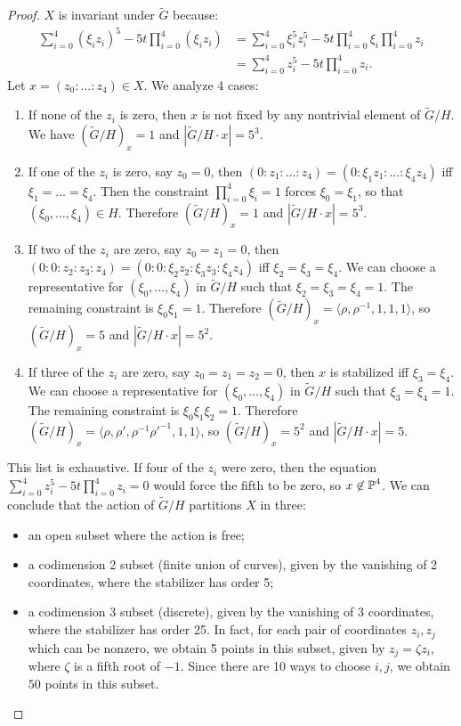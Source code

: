 \documentclass{article}
\begin{document}
\begin{proof}
$X$ is invariant under $\tilde G$ because:
\begin{align*}
\sum_{i=0}^4 (\xi_i z_i)^5 - 5t \prod_{i=0}^4 (\xi_i z_i) &= \sum_{i=0}^4 \xi_i^5 z_i^5 - 5t \prod_{i=0}^4 \xi_i 
\prod_{i=0}^4 z_i \\
&= \sum_{i=0}^4 z_i^5 - 5t \prod_{i=0}^4  z_i.
\end{align*}
Let $x = (z_0:\dots:z_4) \in X$. We analyze 4 cases:
\begin{enumerate}
\item If none of the $z_i$ is zero, then $x$ is not fixed by any nontrivial element of $\tilde G/H$. 
We have $(\tilde G/H)_x = 1$ and $|\tilde G / H \cdot x| = 5^3$.
\item If one of the $z_i$ is zero, say $z_0 = 0$, then $(0:z_1:\dots:z_4) = (0:\xi_1z_1:\dots:\xi_4z_4)$
iff $\xi_1 = \dots = \xi_4$. Then the constraint $\prod_{i=0}^4 \xi_i = 1$ forces $\xi_0 = \xi_1$, so that
$(\xi_0, \dots, \xi_4) \in H$. Therefore $(\tilde G/H)_x = 1$ and $|\tilde G / H \cdot x| = 5^3$.
\item If two of the $z_i$ are zero, say $z_0 = z_1 = 0$, then $(0:0:z_2:z_3:z_4) = (0:0:\xi_2z_2:\xi_3z_3:\xi_4z_4)$
iff $\xi_2 = \xi_3 = \xi_4$. We can choose a representative for $(\xi_0, \dots, \xi_4)$ in $\tilde G/H$ such that
$\xi_2 = \xi_3 = \xi_4 = 1$. The remaining constraint is $\xi_0 \xi_1 = 1$. Therefore $(\tilde G/H)_x = \langle
\rho, \rho^{-1}, 1,1,1\rangle$, so $(\tilde G/H)_x = 5$ and $|\tilde G / H \cdot x| = 5^2$.
\item If three of the $z_i$ are zero, say $z_0 = z_1 = z_2 = 0$, then $x$ is stabilized iff $\xi_3 = \xi_4$. We
can choose a representative for $(\xi_0, \dots, \xi_4)$ in $\tilde G/H$ such that
$ \xi_3 = \xi_4 = 1$. The remaining constraint is $\xi_0 \xi_1 \xi_2 = 1$. Therefore $(\tilde G/H)_x = \langle
\rho, \rho', \rho^{-1}\rho'^{-1},1,1\rangle$, so $(\tilde G/H)_x = 5^2$ and $|\tilde G / H \cdot x| = 5$.
\end{enumerate}
This list is exhaustive. If four of the $z_i$ were zero, then the equation $\sum_{i=0}^4 z_i^5 - 
5t \prod_{i=0}^4 z_i = 0$ would force the fifth to be zero, so $x \not \in \operatorname{\mathbb{P}}^4$. We can conclude that the action
of $\tilde G / H$ partitions $X$ in three:
\begin{itemize}
\item an open subset where the action is free;
\item a codimension 2 subset (finite union of curves), given by the vanishing of 2 coordinates, where the stabilizer has order 5;
\item a codimension 3 subset (discrete), given by the vanishing of 3 coordinates, where the stabilizer
has order 25. In fact, for each pair of coordinates $z_i, z_j$ which can be nonzero, we obtain 5 points in this
subset, given by $z_j = \zeta z_i$, where $\zeta$ is a fifth root of $-1$. Since there are 10 ways to choose
$i,j$, we obtain $50$ points in this subset.
\end{itemize}
\end{proof}
\end{document}

